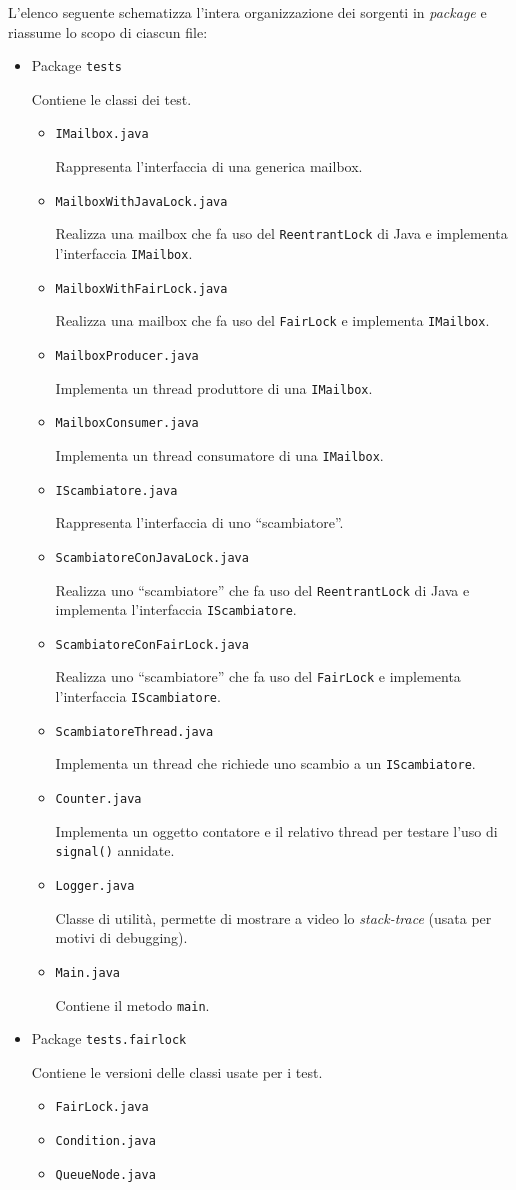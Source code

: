 \documentclass[a4paper,twoside]{article}
\newcommand*\file{\texttt}
\newcommand\code{\lstinline[basicstyle=\normalsize\ttfamily]}
\begin{document}
L'elenco seguente schematizza l'intera organizzazione dei sorgenti in \emph{package} e riassume lo scopo di ciascun file:
%
\begin{itemize}
\item Package \file{tests}\par
Contiene le classi dei test.
\begin{itemize}
\item \file{IMailbox.java}\par
Rappresenta l'interfaccia di una generica mailbox.
\item \file{MailboxWithJavaLock.java}\par
Realizza una mailbox che fa uso del \code|ReentrantLock| di Java e implementa l'interfaccia \code|IMailbox|.
\item \file{MailboxWithFairLock.java}\par
Realizza una mailbox che fa uso del \code|FairLock| e implementa \code|IMailbox|.
\item \file{MailboxProducer.java}\par
Implementa un thread produttore di una \code|IMailbox|.
\item \file{MailboxConsumer.java}\par
Implementa un thread consumatore di una \code|IMailbox|.
\item \file{IScambiatore.java}\par
Rappresenta l'interfaccia di uno “scambiatore”.
\item \file{ScambiatoreConJavaLock.java}\par
Realizza uno “scambiatore” che fa uso del \code|ReentrantLock| di Java e implementa l'interfaccia \code|IScambiatore|.
\item \file{ScambiatoreConFairLock.java}\par
Realizza uno “scambiatore” che fa uso del \code|FairLock| e implementa l'interfaccia \code|IScambiatore|.
\item \file{ScambiatoreThread.java}\par
Implementa un thread che richiede uno scambio a un \code|IScambiatore|.
\item \file{Counter.java}\par
Implementa un oggetto contatore e il relativo thread per testare l'uso di \code|signal()| annidate.
\item \file{Logger.java}\par
Classe di utilità, permette di mostrare a video lo \emph{stack-trace} (usata per motivi di debugging).
\item \file{Main.java}\par
Contiene il metodo \code|main|.
\end{itemize}

\item Package \file{tests.fairlock}\par
Contiene le versioni delle classi usate per i test.
\begin{itemize}
\item \file{FairLock.java}
\item \file{Condition.java}
\item \file{QueueNode.java}
\end{itemize}
\end{itemize}
\end{document}
